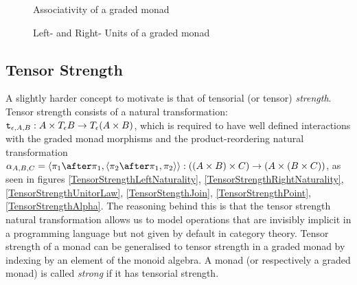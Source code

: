 \documentclass{Report}
\begin{document}
\begin{figure}
\begin{framed}
        \centering
        \begin{minipage}{0.45\textwidth}
            \centering
            \caption{Associativity of a graded monad}
            \label{GradedMonadAssociativity}
        \end{minipage}\hfill
        \begin{minipage}{0.45\textwidth}
            \centering
            \caption{Left- and Right- Units of a graded monad}
            \label{GradedMonadUnits}
        \end{minipage}
\end{framed}
\end{figure}


\subsection{Tensor Strength}
A slightly harder concept to motivate is that of tensorial (or tensor) \textit{strength}. Tensor strength consists of a natural transformation: $\texttt{t}_{\epsilon, A, B}: A \times T_{\epsilon}{B} \rightarrow T_{\epsilon}{(A \times B)}$, which is required to have well defined interactions with the graded monad morphisms and the product-reordering natural transformation $\alpha_{A, B, C} = \pr{\p\after\p}{\pr{\pp\after\p}{\pp}}: ((A \times B) \times C) \rightarrow (A \times (B \times C))$, as seen in figures \ref{TensorStrengthLeftNaturality}, \ref{TensorStrengthRightNaturality}, \ref{TensorStrengthUnitorLaw}, \ref{TensorStengthJoin}, \ref{TensorStrengthPoint}, \ref{TensorStrengthAlpha}. The reasoning behind this is that the tensor strength natural transformation allows us to model operations that are invisibly implicit in a programming language but not given by default in category theory. Tensor strength of a monad can be generalised to tensor strength in a graded monad by indexing by an element of the monoid algebra. A monad (or respectively a graded monad) is called \textit{strong} if it has tensorial strength. 
\end{document}

